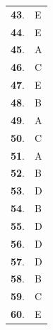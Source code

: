 \documentclass[letterstyle,12pt]{extarticle}
\begin{document}
\begin{supertabular}{ll}
{\bf43}. & E \\ 
{\bf44}. & E \\ 
{\bf45}. & A \\ 
{\bf46}. & C \\ 
{\bf47}. & E \\ 
{\bf48}. & B \\ 
{\bf49}. & A \\ 
{\bf50}. & C \\ 
{\bf51}. & A \\ 
{\bf52}. & B \\ 
{\bf53}. & D \\ 
{\bf54}. & B \\ 
{\bf55}. & D \\ 
{\bf56}. & D \\ 
{\bf57}. & D \\ 
{\bf58}. & B \\ 
{\bf59}. & C \\ 
{\bf60}. & E \\ 

\end{supertabular}
\end{document}
